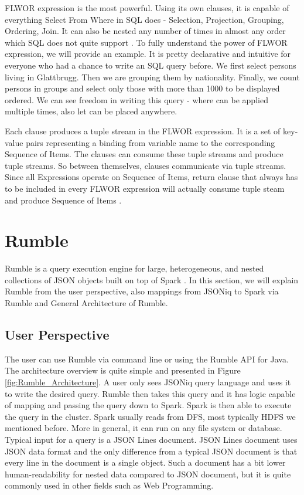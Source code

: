 FLWOR expression is the most powerful. Using its own clauses, it is capable of everything Select From Where in SQL does - Selection, Projection, Grouping, Ordering, Join. It can also be nested any number of times in almost any order which SQL does not quite support \cite{JSONiqBook}. To fully understand the power of FLWOR expression, we will provide an example. It is pretty declarative and intuitive for everyone who had a chance to write an SQL query before. We first select persons living in Glattbrugg. Then we are grouping them by nationality. Finally, we count persons in groups and select only those with more than 1000 to be displayed ordered. We can see freedom in writing this query - where can be applied multiple times, also let can be placed anywhere.



Each clause produces a tuple stream in the FLWOR expression. It is a set of key-value pairs representing a binding from variable name to the corresponding Sequence of Items. The clauses can consume these tuple streams and produce tuple streams. So between themselves, clauses communicate via tuple streams. Since all Expressions operate on Sequence of Items, return clause that always has to be included in every FLWOR expression will actually consume tuple steam and produce Sequence of Items \cite{JSONiqBook}.
   
\section{Rumble}
Rumble is a query execution engine for large, heterogeneous, and nested collections of JSON objects built on top of Spark \cite{RumblePaper}. In this section, we will explain Rumble from the user perspective, also mappings from JSONiq to Spark via Rumble and General Architecture of Rumble.
\subsection{User Perspective}
The user can use Rumble via command line or using the Rumble API for Java. The architecture overview is quite simple and presented in Figure \ref{fig:Rumble_Architecture}. A user only sees JSONiq query language and uses it to write the desired query. Rumble then takes this query and it has logic capable of mapping and passing the query down to Spark. Spark is then able to execute the query in the cluster. Spark usually reads from DFS, most typically HDFS we mentioned before. More in general, it can run on any file system or database. Typical input for a query is a JSON Lines document. JSON Lines document uses JSON data format and the only difference from a typical JSON document is that every line in the document is a single object. Such a document has a bit lower human-readability for nested data compared to JSON document, but it is quite commonly used in other fields such as Web Programming. \cite{RumbleYouTube}

